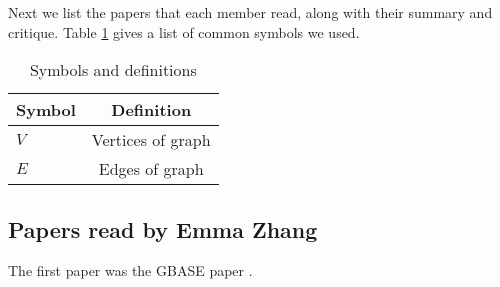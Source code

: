 Next we list the papers that each member read,
along with their summary and critique.
Table \ref{tab:symbols} gives a list of common symbols we used.

\begin{table}[htb]
\begin{center} 
\begin{tabular}{|l | c | } \hline \hline 
Symbol & Definition \\ \hline
$V$ & Vertices of graph \\
$E$ & Edges of graph \\ \hline
\end{tabular} 
\end{center} 
\caption{Symbols and definitions}
\label{tab:symbols} 
 \end{table} 


\subsection{Papers read by Emma Zhang}
The first paper was the GBASE paper \cite{KangTSLF12}.
